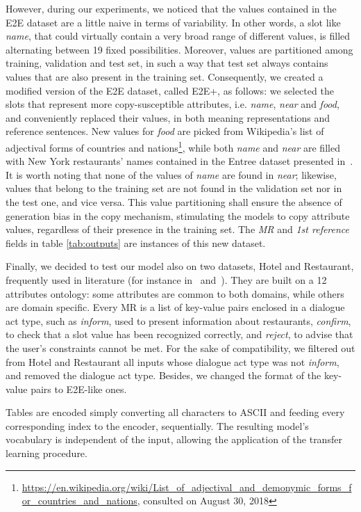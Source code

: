 \documentclass[runningheads, envcountsame, a4paper]{llncs}
\begin{document}
However, during our experiments, we noticed that the values contained in the E2E dataset are a little naive in terms of variability. In other words, a slot like \textit{name}, that could virtually contain a very broad range of different values, is filled alternating between 19 fixed possibilities. Moreover, values are partitioned among training, validation and test set, in such a way that test set always contains values that are also present in the training set.
Consequently, we created a modified version of the E2E dataset, called E2E+, as follows: we selected the slots that represent more copy-susceptible attributes, i.e. \textit{name}, \textit{near} and \textit{food}, and conveniently replaced their values, in both meaning representations and reference sentences. New values for \textit{food} are picked from Wikipedia's list of adjectival forms of countries and nations\footnote{\url{https://en.wikipedia.org/wiki/List_of_adjectival_and_demonymic_forms_for_countries_and_nations}, consulted on August 30, 2018}, while both \textit{name} and \textit{near} are filled with New York restaurants' names contained in the Entree dataset presented in~\cite{Burke:97}. It is worth noting that none of the values of \textit{name} are found in \textit{near}; likewise, values that belong to the training set are not found in the validation set nor in the test one, and vice versa. This value partitioning shall ensure the absence of generation bias in the copy mechanism, stimulating the models to copy attribute values, regardless of their presence in the training set. The \textit{MR} and \textit{1st reference} fields in table \ref{tab:outputs} are instances of this new dataset.

Finally, we decided to test our model also on two datasets, Hotel and Restaurant, frequently used in literature (for instance in~\cite{Wen:15a} and~\cite{Goyal:16}). They are built on a 12 attributes ontology: some attributes are common to both domains, while others are domain specific. Every MR is a list of key-value pairs enclosed in a dialogue act type, such as \textit{inform}, used to present information about restaurants, \textit{confirm}, to check that a slot value has been recognized correctly, and \textit{reject}, to advise that the user's constraints cannot be met. For the sake of compatibility, we filtered out from Hotel and Restaurant all inputs whose dialogue act type was not \textit{inform}, and removed the dialogue act type. Besides, we changed the format of the key-value pairs to E2E-like ones.

Tables are encoded simply converting all characters to ASCII and feeding every corresponding index to the encoder, sequentially. The resulting model's vocabulary is independent of the input, allowing the application of the transfer learning procedure.
\end{document}
